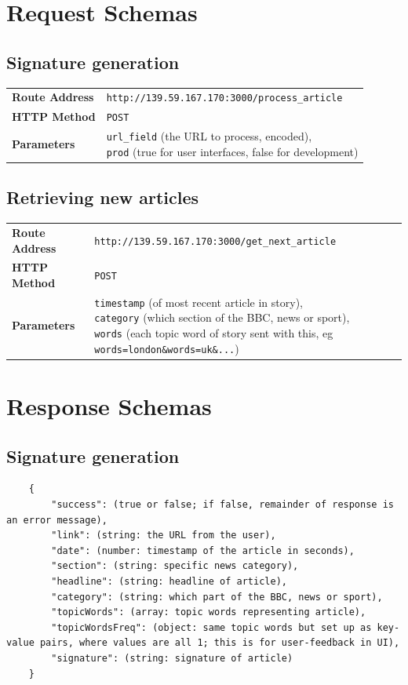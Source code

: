 \documentclass[11pt,titlepage]{report}
\begin{document}
\section{Request Schemas}
\subsection{Signature generation}
\begin{tabular}{>{\bfseries}l l}
Route Address & \lstinline|http://139.59.167.170:3000/process_article| \\
HTTP Method & \lstinline|POST| \\
Parameters & \parbox[t]{10cm}{\lstinline|url_field| (the URL to process, encoded), \\ \lstinline|prod| (true for user interfaces, false for development)} 
\end{tabular}
\subsection{Retrieving new articles}
\begin{tabular}{>{\bfseries}l l}
	Route Address & \lstinline|http://139.59.167.170:3000/get_next_article| \\
	HTTP Method & \lstinline|POST| \\
	Parameters & \parbox[t]{12cm}{\lstinline|timestamp| (of most recent article in story), \\ \lstinline|category| (which section of the BBC, news or sport), \\ \lstinline|words| (each topic word of story sent with this, eg \lstinline|words=london&words=uk&...|)} 
\end{tabular}

\section{Response Schemas}
\subsection{Signature generation}
\begin{lstlisting}
    {
        "success": (true or false; if false, remainder of response is an error message),
        "link": (string: the URL from the user),
        "date": (number: timestamp of the article in seconds),
        "section": (string: specific news category),
        "headline": (string: headline of article),
        "category": (string: which part of the BBC, news or sport),
        "topicWords": (array: topic words representing article),
        "topicWordsFreq": (object: same topic words but set up as key-value pairs, where values are all 1; this is for user-feedback in UI),
        "signature": (string: signature of article)
    }
\end{lstlisting}
\end{document}
